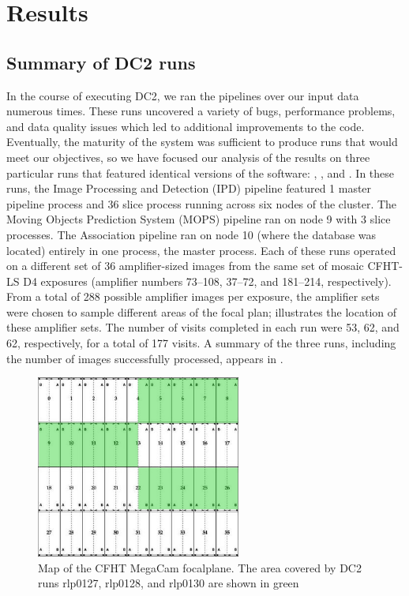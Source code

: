 
\section{Results}

\subsection{Summary of DC2 runs}

In the course of executing DC2, we ran the pipelines over our input data
numerous times.  These runs uncovered a variety of bugs, performance
problems, and data quality issues which led to additional improvements
to the code.  Eventually, the maturity of the system was sufficient to
produce runs that would meet our objectives, so we have focused our
analysis of the results on three particular runs that featured
identical versions of the software: , , and 
.  In these runs, the Image Processing and Detection
(IPD) pipeline featured 1 master pipeline process and 36 slice process
running across six nodes of the cluster.  The Moving Objects
Prediction System (MOPS) pipeline ran on node 9 with 3 slice
processes.  The Association pipeline ran on node 10 (where the
database was located) entirely in one process, the master process.
Each of these runs operated on a different set of 36 amplifier-sized
images from the same set of mosaic CFHT-LS D4 exposures (amplifier
numbers 73--108, 37--72, and 181--214, respectively).  From a total of
288 possible amplifier images per exposure, the amplifier sets were
chosen to sample different areas of the focal plan; 
illustrates the location of these amplifier sets.  The number of 
visits completed in each run were 53, 62, and 62, respectively, for a
total of 177 visits.   A summary of the three runs, including the
number of images successfully processed, appears in .  

\begin{figure}[htbp]
\begin{center}
\includegraphics[height=60mm] {figures/MegaCamMap}
\caption{Map of the CFHT MegaCam focalplane.  The area covered by DC2
  runs rlp0127, rlp0128, and rlp0130 are shown in green\label{f6-1}}
\label{FigMegaCamMap}
\end{center}
\end{figure}

